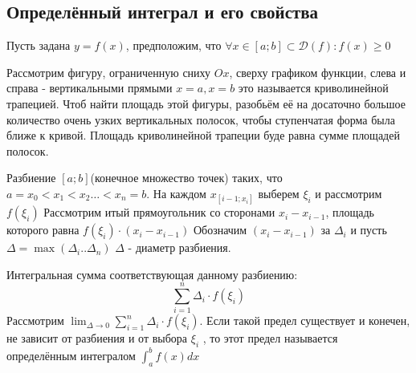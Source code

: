 \documentclass[oneside]{book}
\begin{document}
\begin{enumerate}
\begin{itemize}
\begin{enumerate}
\setcounter{chapter}{34} %
\chapter[Определённый интеграл]{Определённый интеграл и его свойства\\}
Пусть задана $y = f(x)$, предположим, что $\forall x \in [a;b] \subset \mathcal{D}(f): f(x) \geq 0$
\begin{center}
   {\pgfqpoint{-1pt}{-1pt}}%
   {\pgfqpoint{10pt}{10pt}}%
   {\pgfqpoint{9pt}{9pt}}%
   {
     \pgfsetlinewidth{0.4pt}
     \pgfpathmoveto{\pgfqpoint{0pt}{0pt}}
     \pgfpathlineto{\pgfqpoint{9.1pt}{9.1pt}}
    }
    \end{center}

Рассмотрим фигуру, ограниченную сниху $Ox$, сверху графиком функции, слева и справа - вертикальными прямыми
$x = a, x = b$ это называется криволинейной трапецией. Чтоб найти площадь этой фигуры, разобьём её на досаточно
большое количество очень узких вертикальных полосок, чтобы ступенчатая форма была ближе к кривой. Площадь криволинейной
трапеции буде равна сумме площадей полосок.
\par Разбиение $[a;b]$(конечное множество точек) таких, что $a = x_0 <x_1 < x_2 \dots < x_n = b$. На каждом $x_{[i-1;x_i]}$
выберем $\xi_i$ и рассмотрим $f(\xi_i)$ Рассмотрим итый прямоугольник со сторонами $x_i - x_{i-1}$, площадь которого равна
$f(\xi_i)\cdot (x_i - x_{i-1})$ Обозначим $(x_i - x_{i-1})$ за $\Delta_i$ и пусть $\Delta = \max(\Delta_i .. \Delta_n)$
$\Delta$ - диаметр разбиения.
\par Интегральная сумма соответствующая данному разбиению: $$
  \sum_{i = 1}^n \Delta_i \cdot f(\xi_i)
$$
Рассмотрим $\lim_{\Delta \rightarrow 0}{\sum_{i = 1}^n \Delta_i \cdot f(\xi_i)} $. Если такой предел существует и конечен, не зависит от
разбиения и от выбора $\xi_i$ , то этот предел называется определённым интегралом $\int_{a}^b f(x) dx$



\end{enumerate}
\end{itemize}
\end{enumerate}
\end{document}
